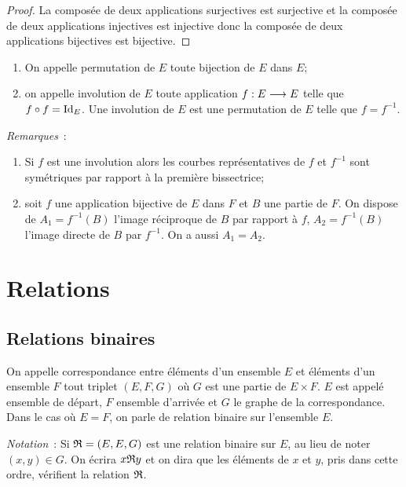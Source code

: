 \begin{proof}
  La composée de deux applications surjectives est surjective et la composée de 
  deux applications injectives est injective donc la composée de deux applications 
  bijectives est bijective.
\end{proof}

\begin{defdef}
  \begin{enumerate}
    \item On appelle permutation de \(E\) toute bijection de \(E\) dans \(E\);
    \item on appelle involution de \(E\) toute application 
      \(f:E \longrightarrow E\) telle que \(f \circ f = \operatorname{Id}_E\). Une 
      involution de \(E\) est une permutation de \(E\) telle que 
      \(f = f^{-1}\).
  \end{enumerate}
\end{defdef}

\emph{Remarques}~:
\begin{enumerate}
  \item Si \(f\) est une involution alors les courbes représentatives de \(f\) 
    et \(f^{-1}\) sont symétriques par rapport à la première bissectrice;
  \item soit \(f\) une application bijective de \(E\) dans \(F\) et \(B\) une 
    partie de \(F\). On dispose de \(A_1 = f^{-1}(B)\) l'image réciproque de 
    \(B\) par rapport à \(f\), \(A_2 = f^{-1}(B)\) l'image directe de \(B\) 
    par \(f^{-1}\). On a aussi \(A_1 = A_2\).
\end{enumerate}

\section{Relations}
\label{chap3-sec:relations}

\subsection{Relations binaires}
\label{chap3-subsec:relationbinaire}

\begin{defdef}
  On appelle correspondance entre éléments d'un ensemble \(E\) et éléments 
  d'un ensemble \(F\) tout triplet \((E, F, G)\) où \(G\) est une partie de \(E 
  \times F\). \(E\) est appelé ensemble de départ, \(F\) ensemble d'arrivée et 
  \(G\) le graphe de la correspondance. Dans le cas où \(E = F\), on parle de 
  relation binaire sur l'ensemble \(E\).
\end{defdef}
\emph{Notation}~: Si \(\mathfrak{R} = (E, E, G)\) est une relation binaire sur \(E\), 
au lieu de noter \((x, y) \in G\). On écrira \(x\mathfrak{R}{}y\) et on dira que les 
éléments de \(x\) et \(y\), pris dans cette ordre, vérifient la relation 
\(\mathfrak{R}\).

